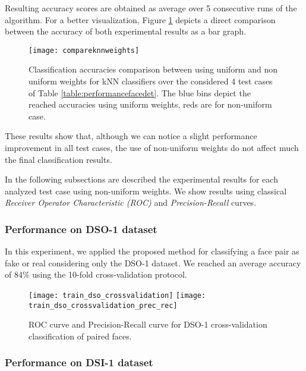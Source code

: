 Resulting accuracy scores are obtained as average over 5 consecutive runs of the algorithm. For a better visualization, Figure \ref{fig:compareknnweights} depicts a direct comparison between the accuracy of both experimental results as a bar graph.

\begin{figure}[h!]
  \centering
    \texttt{[image: compareknnweights]}
    \caption{Classification accuracies comparison between using uniform and non uniform weights for kNN classifiers over the considered 4 test cases of Table \ref{table:performancefacedet}. The blue bins depict the reached accuracies using uniform weights, reds are for non-uniform case.}
    \label{fig:compareknnweights}
\end{figure}

These results show that, although we can notice a slight performance improvement in all test cases, the use of non-uniform weights do not affect much the final classification results.

In the following subsections are described the experimental results for each analyzed test case using non-uniform weights. We show results using classical \emph{Receiver Operator Characteristic (ROC)} \cite{fawcett2006introduction} and \emph{Precision-Recall} curves\cite{Davis:2006:RPR:1143844.1143874}. 

\subsubsection{Performance on DSO-1 dataset}

In this experiment, we applied the proposed method for classifying a face pair as fake or real considering only the DSO-1 dataset. We reached an average accuracy of 84\% using the 10-fold cross-validation protocol.

\begin{figure}[!htb]
  \texttt{[image: train\_dso\_crossvalidation]}
\endminipage\hfill
{}
  \texttt{[image: train\_dso\_crossvalidation\_prec\_rec]}
\endminipage
\caption{ROC curve and Precision-Recall curve for DSO-1 cross-validation classification of paired faces.}\label{fig:regiondetnormal}
\end{figure}

\subsubsection{Performance on DSI-1 dataset}

